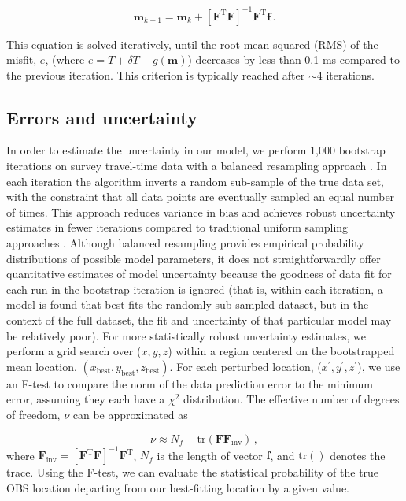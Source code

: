 \begin{equation}
	\mathbf{m}_{k+1} = \mathbf{m}_k + \left[ \mathbf{F}^{\text{T}} \mathbf{F} \right]^{-1} \mathbf{F}^{\text{T}} \mathbf{f} \,. \label{eq:inverse}
\end{equation}

This equation is solved iteratively, until the root-mean-squared (RMS) of the misfit, $e$, (where $e = T+\delta T-g(\mathbf{m})$) decreases by less than 0.1 ms compared to the previous iteration. This criterion is typically reached after $\sim$4 iterations. 

\subsection{Errors and uncertainty}
In order to estimate the uncertainty in our model, we perform 1,000 bootstrap iterations on survey travel-time data with a balanced resampling approach \citep{Davison1986}. In each iteration the algorithm inverts a random sub-sample of the true data set, with the constraint that all data points are eventually sampled an equal number of times. This approach reduces variance in bias and achieves robust uncertainty estimates in fewer iterations compared to traditional uniform sampling approaches \citep{Hung2011}. Although balanced resampling provides empirical probability distributions of possible model parameters, it does not straightforwardly offer quantitative estimates of model uncertainty because the goodness of data fit for each run in the bootstrap iteration is ignored (that is, within each iteration, a model is found that best fits the randomly sub-sampled dataset, but in the context of the full dataset, the fit and uncertainty of that particular model may be relatively poor). For more statistically robust uncertainty estimates, we perform a grid search over ($x,y,z$) within a region centered on the bootstrapped mean location, 
$(x_{{\text{best}}},y_{{\text{best}}},z_{{\text{best}}})$. For each perturbed location, ($x^{\prime},y^{\prime},z^{\prime}$), we use an F-test to compare the norm of the data prediction error to the minimum error, assuming they each have a $\chi^2$ distribution. The effective number of degrees of freedom, $\nu$ can be approximated as 

\begin{equation}
\nu \approx N_f - \text{tr}(\mathbf{F}\mathbf{F}_{\text{inv}}) \,,
\end{equation}
where $\mathbf{F}_{\text{inv}}= \left[ \mathbf{F}^{\text{T}} \mathbf{F} \right]^{-1} \mathbf{F}^{\text{T}}$, $N_f$ is the length of vector $\mathbf{f}$, and $\text{tr}()$ denotes the trace. Using the F-test, we can evaluate the statistical probability of the true OBS location departing from our best-fitting location by a given value. 

